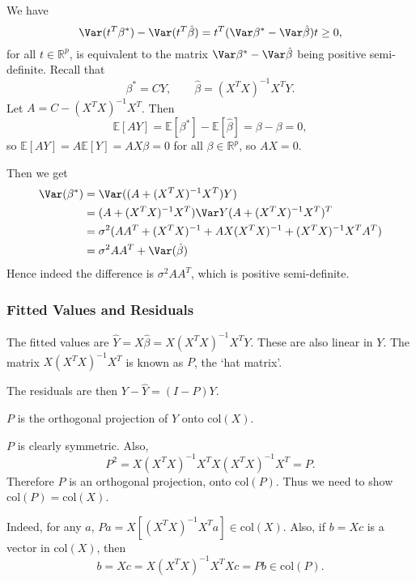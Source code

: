 \documentclass[12pt]{article}
\begin{document}
\begin{proofbox}
	We have
	\[
	\Var(t^{T}\beta^{\ast}) - \Var(t^{T}\hat \beta) = t^{T}(\Var \beta^{\ast}-\Var\hat\beta)t \ge 0,
	\]
	for all $t \in \mathbb{R}^{p}$, is equivalent to the matrix $\Var \beta^{\ast} - \Var \hat\beta$ being positive semi-definite. Recall that
	\[
	\beta^{\ast} = CY, \qquad \hat\beta = (X^{T}X)^{-1}X^{T}Y.
	\]
	Let $A = C-(X^{T}X)^{-1}X^{T}$. Then
	\[
	\mathbb{E}[AY] = \mathbb{E}[\beta^{\ast}] - \mathbb{E}[\hat\beta] = \beta - \beta = 0,
	\]
	so $\mathbb{E}[AY] = A \mathbb{E}[Y] = AX\beta = 0$ for all $\beta \in \mathbb{R}^{p}$, so $AX = 0$.

	Then we get
	\begin{align*}
		\Var (\beta^{\ast}) &= \Var((A + (X^{T}X)^{-1}X^{T})Y) \\
				  &= (A+(X^{T}X)^{-1}X^{T})\Var Y (A + (X^{T}X)^{-1}X^{T})^{T} \\
				  &= \sigma^2(AA^{T} + (X^{T}X)^{-1} + AX(X^{T}X)^{-1} + (X^{T}X)^{-1}X^{T}A^{T}) \\
				  &= \sigma^2 AA^{T} + \Var (\hat \beta)
	\end{align*}
	Hence indeed the difference is $\sigma^2 AA^{T}$, which is positive semi-definite.
\end{proofbox}

\subsubsection{Fitted Values and Residuals}
\label{subsub:fitted_values_and_residuals}

The fitted values are $\hat Y = X \hat \beta = X(X^{T}X)^{-1}X^{T}Y$. These are also linear in $Y$. The matrix $X(X^{T}X)^{-1}X^{T}$ is known as $P$, the `hat matrix'.

The residuals are then $Y - \hat Y = (I-P)Y$.

\begin{proposition}
	$P$ is the orthogonal projection of $Y$ onto $\mathrm{col}(X)$.
\end{proposition}

\begin{proofbox}
	$P$ is clearly symmetric. Also,
	\[
	P^2 = X(X^{T}X)^{-1}X^{T}X(X^{T}X)^{-1}X^{T} = P.
	\]
	Therefore $P$ is an orthogonal projection, onto $\mathrm{col}(P)$. Thus we need to show $\mathrm{col}(P) = \mathrm{col}(X)$.

	Indeed, for any $a$, $Pa = X[(X^{T}X)^{-1}X^{T}a] \in \mathrm{col}(X)$. Also, if $b = Xc$ is a vector in $\mathrm{col}(X)$, then
	\[
		b = Xc = X(X^{T}X)^{-1}X^{T}Xc = Pb \in \mathrm{col}(P).
	\]
\end{proofbox}
\end{document}
